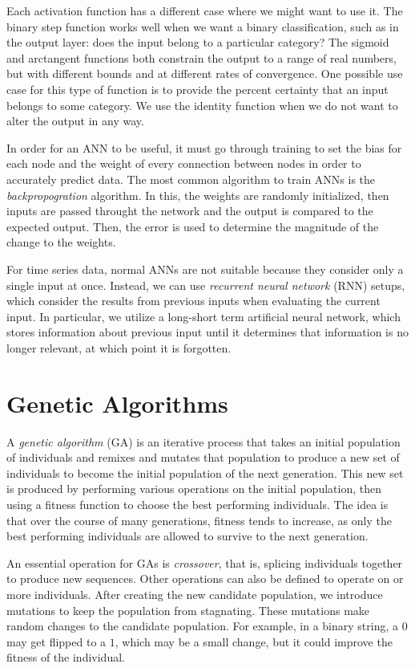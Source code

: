 Each activation function has a different case where we might want to use it.
The binary step function works well when we want a binary classification, such as in the output layer: does the input belong to a particular category?
The sigmoid and arctangent functions both constrain the output to a range of real numbers, but with different bounds and at different rates of convergence.
One possible use case for this type of function is to provide the percent certainty that an input belongs to some category.
We use the identity function when we do not want to alter the output in any way.

In order for an ANN to be useful, it must go through training to set the bias for each node and the weight of every connection between nodes in order to accurately predict data.
The most common algorithm to train ANNs is the \textit{backpropogration} algorithm.
In this, the weights are randomly initialized, then inputs are passed throught the network and the output is compared to the expected output.
Then, the error is used to determine the magnitude of the change to the weights.

For time series data, normal ANNs are not suitable because they consider only a single input at once.
Instead, we can use \textit{recurrent neural network} (RNN) setups, which consider the results from previous inputs when evaluating the current input.
In particular, we utilize a long-short term artificial neural network, which stores information about previous input until it determines that information is no longer relevant, at which point it is forgotten.

\section{Genetic Algorithms} \label{bg:ga}

A \textit{genetic algorithm} (GA) is an iterative process that takes an initial population of individuals and remixes and mutates that population to produce a new set of individuals to become the initial population of the next generation.
This new set is produced by performing various operations on the initial population, then using a fitness function to choose the best performing individuals.
The idea is that over the course of many generations, fitness tends to increase, as only the best performing individuals are allowed to survive to the next generation.

An essential operation for GAs is \textit{crossover}, that is, splicing individuals together to produce new sequences.
Other operations can also be defined to operate on or more individuals.
After creating the new candidate population, we introduce mutations to keep the population from stagnating.
These mutations make random changes to the candidate population.
For example, in a binary string, a $0$ may get flipped to a $1$, which may be a small change, but it could improve the fitness of the individual.

